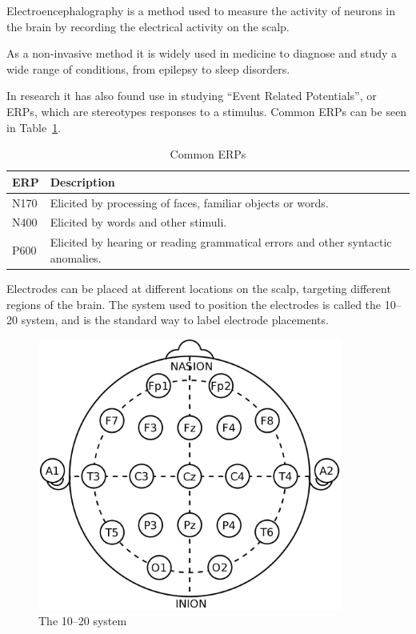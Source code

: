 \documentclass[a4paper]{article}
\begin{document}
\begin{refsection}
        Electroencephalography is a method used to measure the activity of neurons in the brain by recording the electrical activity on the scalp.

        As a non-invasive method it is widely used in medicine to diagnose and study a wide range of conditions, from epilepsy to sleep disorders.

        In research it has also found use in studying ``Event Related Potentials'', or ERPs, which are stereotypes responses to a stimulus. Common ERPs can be seen in Table~\ref{table:erps}.

        \begin{table}
            \begin{tabular}{ll}
                \toprule
                ERP & Description
                \\
                \midrule
                N170 & Elicited by processing of faces, familiar objects or words.
                \\
                N400 & Elicited by words and other stimuli.
                \\
                P600 & Elicited by hearing or reading grammatical errors and other syntactic anomalies.
                \\
                \bottomrule
            \end{tabular}
            \caption{Common ERPs}\label{table:erps}
        \end{table}

        Electrodes can be placed at different locations on the scalp, targeting different regions of the brain. The system used to position the electrodes is called the 10–20 system, and is the standard way to label electrode placements.

        \begin{figure}
            \begin{center}
                \includegraphics[width=10cm]{img/1020 system.png}
            \end{center}
            \caption{The 10–20 system}\label{fig:1020}
        \end{figure}


\end{refsection}
\end{document}
